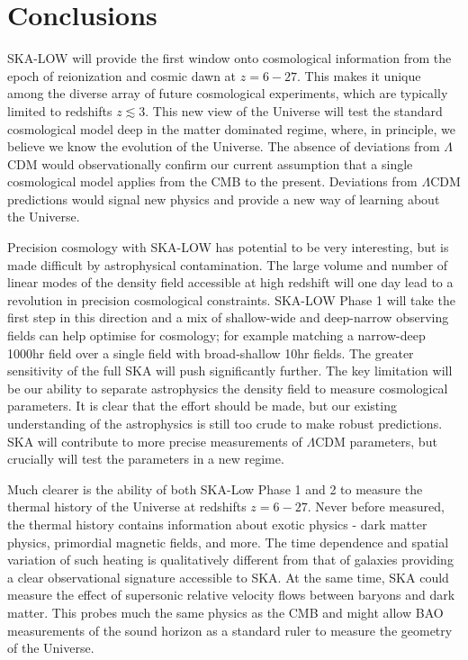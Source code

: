 \documentclass{PoS}
\begin{document}
\section{Conclusions}

SKA-LOW will provide the first window onto cosmological information from the epoch of reionization and cosmic dawn at $z=6-27$. This makes it unique among the diverse array of future cosmological experiments, which are typically limited to redshifts $z\lesssim3$. This new view of the Universe will test the standard cosmological model deep in the matter dominated regime, where, in principle, we believe we know the evolution of the Universe. The absence of deviations from $\Lambda$CDM would observationally confirm our current assumption that a single cosmological model applies from the CMB to the present. Deviations from $\Lambda$CDM predictions would signal new physics and provide a new way of learning about the Universe.

Precision cosmology with SKA-LOW has potential to be very interesting, but is made difficult by astrophysical contamination. The large volume and number of linear modes of the density field accessible at high redshift will one day lead to a revolution in precision cosmological constraints. SKA-LOW Phase 1 will take the first step in this direction and a mix of shallow-wide and deep-narrow observing fields can help optimise for cosmology; for example matching a narrow-deep 1000hr field over a single field with broad-shallow 10hr fields. The greater sensitivity of the full SKA will push significantly further. The key limitation will be our ability to separate astrophysics the density field to measure cosmological parameters. It is clear that the effort should be made, but our existing understanding of the astrophysics is still too crude to make robust predictions. SKA will contribute to more precise measurements of $\Lambda$CDM parameters, but crucially will test the parameters in a new regime.

Much clearer is the ability of both SKA-Low Phase 1 and 2 to measure the thermal history of the Universe at redshifts $z=6-27$. Never before measured, the thermal history contains information about exotic physics - dark matter physics, primordial magnetic fields, and more. The time dependence and spatial variation of such heating is qualitatively different from that of galaxies providing a clear observational signature accessible to SKA. At the same time, SKA could measure the effect of supersonic relative velocity flows between baryons and dark matter. This probes much the same physics as the CMB and might allow BAO measurements of the sound horizon as a standard ruler to measure the geometry of the Universe.
\end{document}
